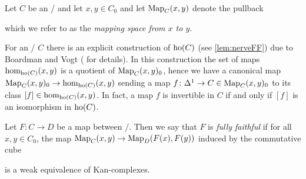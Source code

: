 \begin{definition}\label{def:mappingSpace}
    Let $C$ be an \inftycat/ and let $x,y\in C_0$ and let $\operatorname{Map}_C(x,y)$ denote the pullback 
    \begin{center}
    \end{center}
    which we refer to as the \emph{mapping space from $x$ to $y$}.
\end{definition}
\begin{remark}\label{rmk:boardmanVogt}
    For an \inftycat/ $C$ there is an explicit construction of $\operatorname{ho}(C)$ (see \cref{lem:nerveFF}) due to Boardman and Vogt (\cite[Theorem 1.6.6]{cisinski_2019} for details).
    In this construction the set of maps $\hom_{\operatorname{ho}(C)}(x,y)$ is a quotient of $\operatorname{Map}_C(x,y)_0$, hence we have a canonical map $\operatorname{Map}_C(x,y)_0\to\hom_{\operatorname{ho}(C)}(x,y)$ sending a map $f\colon\Delta^1\to C\in\operatorname{Map}_C(x,y)_0$ to its class $[f]\in\hom_{\operatorname{ho}(C)}(x,y)$.
    In fact, a map $f$ is invertible in $C$ if and only if $[f]$ is an isomorphism in $\operatorname{ho}(C)$.
\end{remark}
\begin{definition}
    Let $F\colon C\to D$ be a map between \inftycats/.
    Then we say that $F$ is \emph{fully faithful} if for all $x,y\in C_0$, the map $\operatorname{Map}_C(x,y)\to\operatorname{Map}_D(F(x),F(y))$ induced by the commutative cube
    \begin{center}
    \end{center}
    is a weak equivalence of Kan-complexes.
\end{definition}
